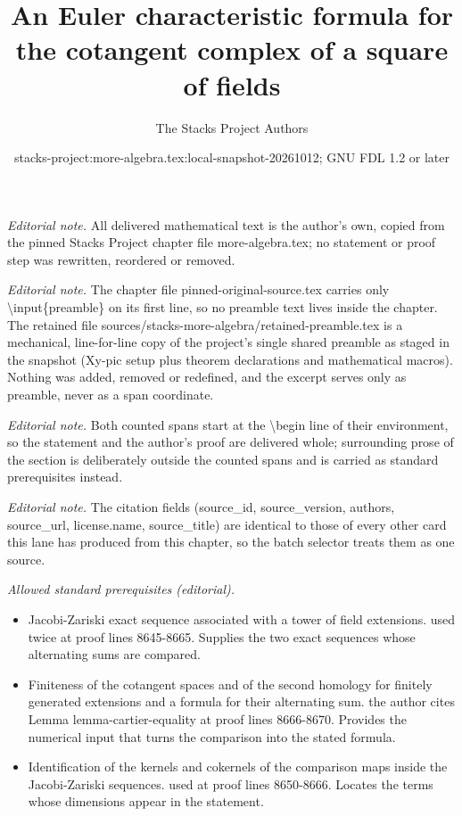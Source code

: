 \documentclass[10pt,a4paper]{amsart}
\title{An Euler characteristic formula for the cotangent complex of a square of fields}
\author{The Stacks Project Authors}
\date{stacks-project:more-algebra.tex:local-snapshot-20261012; GNU FDL 1.2 or later}
\theoremstyle{plain}
\theoremstyle{definition}
\theoremstyle{remark}
\numberwithin{equation}{subsection}
\begin{document}
\maketitle
\setcounter{subsection}{1}
\noindent\textit{Editorial note.} All delivered mathematical text is the author's own, copied from the pinned Stacks Project chapter file more-algebra.tex; no statement or proof step was rewritten, reordered or removed.\par\medskip
\noindent\textit{Editorial note.} The chapter file pinned-original-source.tex carries only \textbackslash{}input\{preamble\} on its first line, so no preamble text lives inside the chapter. The retained file sources/stacks-more-algebra/retained-preamble.tex is a mechanical, line-for-line copy of the project's single shared preamble as staged in the snapshot (Xy-pic setup plus theorem declarations and mathematical macros). Nothing was added, removed or redefined, and the excerpt serves only as preamble, never as a span coordinate.\par\medskip
\noindent\textit{Editorial note.} Both counted spans start at the \textbackslash{}begin line of their environment, so the statement and the author's proof are delivered whole; surrounding prose of the section is deliberately outside the counted spans and is carried as standard prerequisites instead.\par\medskip
\noindent\textit{Editorial note.} The citation fields (source\_id, source\_version, authors, source\_url, license.name, source\_title) are identical to those of every other card this lane has produced from this chapter, so the batch selector treats them as one source.\par\medskip
\noindent\textit{Allowed standard prerequisites (editorial).}\begin{itemize}
\item Jacobi-Zariski exact sequence associated with a tower of field extensions. used twice at proof lines 8645-8665. Supplies the two exact sequences whose alternating sums are compared.
\item Finiteness of the cotangent spaces and of the second homology for finitely generated extensions and a formula for their alternating sum. the author cites Lemma lemma-cartier-equality at proof lines 8666-8670. Provides the numerical input that turns the comparison into the stated formula.
\item Identification of the kernels and cokernels of the comparison maps inside the Jacobi-Zariski sequences. used at proof lines 8650-8666. Locates the terms whose dimensions appear in the statement.
\end{itemize}\medskip
\end{document}
